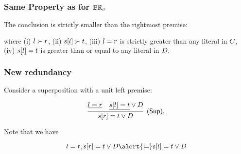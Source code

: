       \begin{frame}\frametitle{Same Property as for $\mathbb{BR}_{\sigma}$}

The conclusion is \alert{strictly smaller} than the rightmost premise:

where (i) ${l \succ r}$, (ii) ${s[l] \succ t}$, (iii)
${{l = r}}$ is strictly greater than any literal in $ C$,
(iv) ${{s[l] = t}}$ is greater than or equal to
any literal in $ D$.


                               \end{frame}



      \begin{frame}\frametitle{New redundancy}

Consider a superposition with a unit left premise:

 \[
    \infer[(\ruleSup),]{
      s[r] \eql t \orl D
      }{
      \underline{l \eql r}
      &
      \underline{s[l] \eql t} \orl D
    }
 \]

Note that we have

 \[
     l \eql r,
      s[r] \eql t \orl D
     \alert{\models}
      s[l] \eql t \orl D
\]



\medskip



                               \end{frame}



